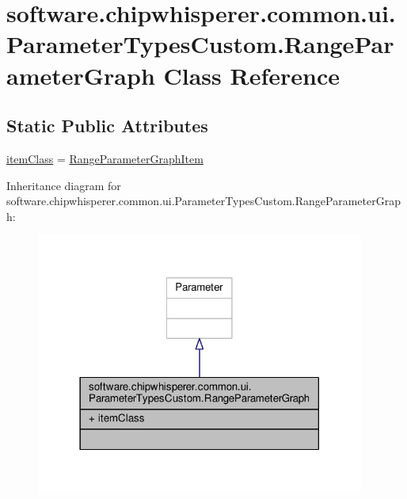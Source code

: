 \hypertarget{classsoftware_1_1chipwhisperer_1_1common_1_1ui_1_1ParameterTypesCustom_1_1RangeParameterGraph}{}\section{software.\+chipwhisperer.\+common.\+ui.\+Parameter\+Types\+Custom.\+Range\+Parameter\+Graph Class Reference}
\label{classsoftware_1_1chipwhisperer_1_1common_1_1ui_1_1ParameterTypesCustom_1_1RangeParameterGraph}
\subsection*{Static Public Attributes}
\begin{DoxyCompactItemize}
\item 
\hyperlink{classsoftware_1_1chipwhisperer_1_1common_1_1ui_1_1ParameterTypesCustom_1_1RangeParameterGraph_a9abfc03cfabedbf2b54faa47bff90af0}{item\+Class} = \hyperlink{classsoftware_1_1chipwhisperer_1_1common_1_1ui_1_1ParameterTypesCustom_1_1RangeParameterGraphItem}{Range\+Parameter\+Graph\+Item}
\end{DoxyCompactItemize}


Inheritance diagram for software.\+chipwhisperer.\+common.\+ui.\+Parameter\+Types\+Custom.\+Range\+Parameter\+Graph\+:\nopagebreak
\begin{figure}[H]
\begin{center}
\leavevmode
\includegraphics[width=306pt]{d2/dc4/classsoftware_1_1chipwhisperer_1_1common_1_1ui_1_1ParameterTypesCustom_1_1RangeParameterGraph__inherit__graph}
\end{center}
\end{figure}


